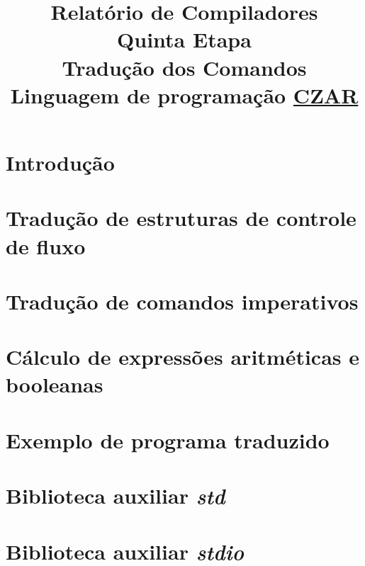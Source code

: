 \documentclass[12pt,oneside,a4paper,english]{abntex2}
\title{Relatório de Compiladores\\Quinta Etapa\\Tradução dos Comandos\\Linguagem de programação \underline{CZAR}}
\begin{document}
\frenchspacing %

\imprimirfolhaderosto

\tableofcontents

\textual

\chapter{Introdução}
\label{chap:introducao}
	

\chapter{Tradução de estruturas de controle de fluxo}
\label{chap:traducao-estruturas-controle}
	

\chapter{Tradução de comandos imperativos}
\label{chap:traducao-comandos-imperativos}
	
	
\chapter{Cálculo de expressões aritméticas e booleanas}
\label{chap:calculo-expressoes}
	

\chapter{Exemplo de programa traduzido}
\label{chap:caracteristicas-gerais}
	

\postextual



\begin{apendicesenv} %

	\partapendices
	
	\chapter{Biblioteca auxiliar \emph{std}}
	\label{app:std}
	
	
	
	\chapter{Biblioteca auxiliar \emph{stdio}}
	\label{app:stdio}
	
	

\end{apendicesenv}
\end{document}
